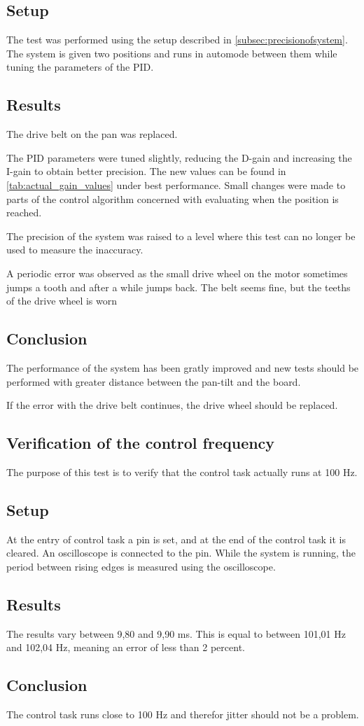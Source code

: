 \subsection*{Setup}
The test was performed using the setup described in \ref{subsec:precisionofsystem}. The
system is given two positions and runs in automode between them while tuning the
parameters of the PID.

\subsection*{Results}
The drive belt on the pan was replaced.

The PID parameters were tuned slightly, reducing the D-gain and increasing the
I-gain to obtain better precision. The new values can be found in
\ref{tab:actual_gain_values} under best performance. Small changes were made to
parts of the control algorithm concerned with evaluating when the position is reached.

The precision of the system was raised to a level where this test can no
longer be used to measure the inaccuracy. 

A periodic error was observed as the small drive wheel on the motor sometimes
jumps a tooth and after a while jumps back. The belt seems fine, but
the teeths of the drive wheel is worn

\subsection*{Conclusion}
The performance of the system has been gratly improved and new tests should be
performed with greater distance between the pan-tilt and the board. 

If the error with the drive belt continues, the drive wheel should be replaced.


\subsection{Verification of the control frequency}
The purpose of this test is to verify that the control task actually runs at 100 Hz.

\subsection*{Setup}
At the entry of control task a pin is set, and at the end of the control task it
is cleared. An oscilloscope is connected to the pin. While the system is running, the period between rising edges is measured using the oscilloscope.

\subsection*{Results}
The results vary between 9,80 and 9,90 ms. This is equal to between 101,01 Hz and 102,04 Hz, meaning an error of less than 2 percent.

\subsection*{Conclusion}
The control task runs close to 100 Hz and therefor jitter should not be a problem.









